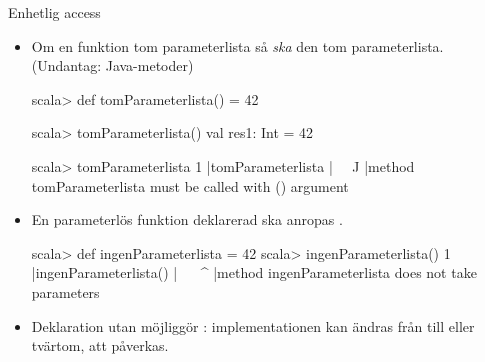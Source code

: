 \begin{Slide}{Enhetlig access}\SlideFontSmall
\begin{itemize}
\item Om en funktion   tom parameterlista \code{()} så \emph{ska} den   tom parameterlista. \hfill (Undantag: Java-metoder)
\begin{REPLsmall}
scala> def tomParameterlista() = 42

scala> tomParameterlista()
val res1: Int = 42

scala> tomParameterlista                                                                                                                    
1 |tomParameterlista
  |^^^^^^^^^^^^^^^^^
  |method tomParameterlista must be called with () argument
\end{REPLsmall}

\item En parameterlös funktion deklarerad  \code{()} ska anropas  \code{()}. 
\begin{REPLsmall}
scala> def ingenParameterlista = 42
scala> ingenParameterlista()
1 |ingenParameterlista()
  |^^^^^^^^^^^^^^^^^^^
  |method ingenParameterlista does not take parameters
\end{REPLsmall}
\pause
\item Deklaration utan \code{()} möjliggör : implementationen kan ändras från  till  eller tvärtom,  att  påverkas.

\end{itemize}
\end{Slide}


